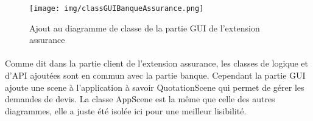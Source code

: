 \begin{figure}[ht]
    \centering
    \texttt{[image: img/classGUIBanqueAssurance.png]}
    \caption{Ajout au diagramme de classe de la partie GUI de l'extension assurance}
    \label{fig1}
    \end{figure}

\paragraph{}Comme dit dans la partie client de l’extension assurance, les classes de logique et d’API ajoutées sont en commun avec la partie banque. Cependant la partie GUI ajoute une scene à l’application à savoir QuotationScene qui permet de gérer les demandes de devis. La classe AppScene est la même que celle des autres diagrammes, elle a juste été isolée ici pour une meilleur lisibilité.
